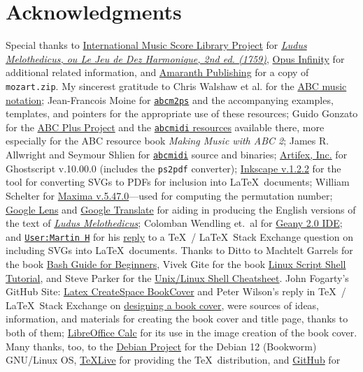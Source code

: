 \documentclass[a4paper,x11names,svgnames,10pt]{article}
\begin{document}
{\section{Acknowledgments}
Special thanks to \href{https://imslp.org}{International Music Score Library Project} for \href{https://imslp.org/wiki/Ludus_Melothedicus_(Anonymous)}{\it Ludus Melothedicus, ou Le Jeu de Dez Harmonique, 2nd ed. (1759)}, \href{https://opus-infinity.org}{Opus Infinity} for additional related information, and \href{http://www.amaranthpublishing.com/MozartDiceGame.htm}{Amaranth Publishing} for a copy of {\tt mozart.zip}. My sincerest gratitude to Chris Walshaw et al. for the \href{http://www.abcnotation.com/}{ABC music notation}; Jean-Francois Moine for \href{http://moinejf.free.fr/}{\tt abcm2ps} and the accompanying examples, templates, and pointers for the appropriate use of these resources; Guido Gonzato for the \href{http://abcplus.sourceforge.net/}{ABC Plus Project} and the \href{http://abcplus.sourceforge.net/#abcMIDI}{{\tt abcmidi} resources} available there, more especially for the ABC resource book {\em Making Music with ABC 2}; James R. Allwright and Seymour Shlien for \href{http://abc.sourceforge.net/abcMIDI}{\tt abcmidi} source and binaries; \href{https://artifex.com/}{Artifex, Inc.} for Ghostscript v.10.00.0 (includes the {\tt ps2pdf} converter); \href{https://www.inkscape.org/}{Inkscape v.1.2.2} for the tool for converting SVGs to PDFs for inclusion into \LaTeX\ documents; William Schelter for \href{https://maxima.sourceforge.io}{Maxima v.5.47.0}---used for computing the permutation number; \href{https://google.lens}{Google Lens} and \href{https://translate.google.com}{Google Translate} for aiding in producing the English versions of the text of \href{https://imslp.org/wiki/Ludus_Melothedicus_(Anonymous)}{{\em Ludus Melothedicus}}; Colomban Wendling et.\ al for \href{https://www.geany.org}{Geany 2.0 IDE}; and \href{https://tex.stackexchange.com/users/632/martin-h}{\tt User:Martin H} for his \href{https://tex.stackexchange.com/questions/2099/how-to-include-svg-diagrams-in-latex}{reply} to a \TeX\ / \LaTeX\ Stack Exchange question on including SVGs into \LaTeX\ documents. Thanks to  Ditto to Machtelt Garrels for the book \href{http://tldp.org/LDP/Bash-Beginners-Guide/html/Bash-Beginners-Guide.html}{Bash Guide for Beginners}, Vivek Gite for the book \href{http://www.freeos.com/guides/lsst/}{Linux Script Shell Tutorial}, and Steve Parker for the \href{http://steve-parker.org/sh/cheatsheet.pdf}{Unix/Linux Shell Cheatsheet}. John Fogarty's GitHub Site: \href{https://github.com/jfogarty/latex-createspace-bookcover}{Latex CreateSpace BookCover} and Peter Wilson's reply in  \TeX\ / \LaTeX\ Stack Exchange on \href{https://tex.stackexchange.com/questions/17579/how-can-i-design-a-book-cover}{designing a book cover}, were sources of ideas, information, and materials for creating the book cover and title page, thanks to both of them; \href{http://www.libreoffice.org/}{LibreOffice Calc} for its use in the image creation of the book cover.  Many thanks, too, to the \href{https://www.debian.org}{Debian Project} for the Debian 12 (Bookworm) GNU/Linux OS, \href{http://www.tug.org/texlive/}{TeXLive} for providing the \TeX\ distribution,  and \href{https://github.com}{GitHub} for }
\end{document}
